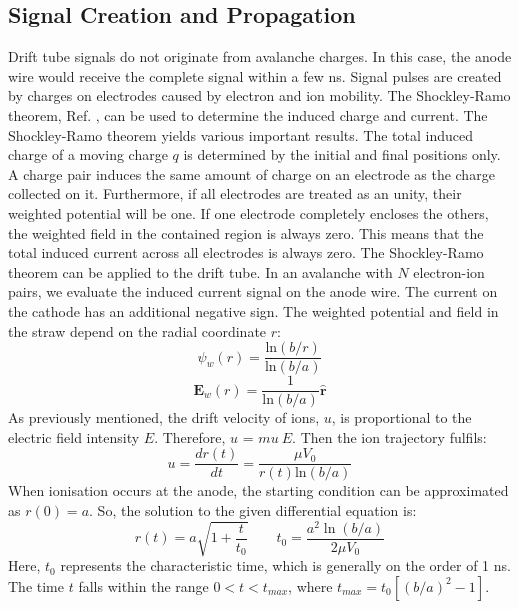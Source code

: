 \subsection{Signal Creation and Propagation}
Drift tube signals do not originate from avalanche charges. In this case, the anode wire would 
receive the complete signal within a few ns. Signal pulses are created by charges on electrodes 
caused by electron and ion mobility. The Shockley-Ramo theorem, Ref. \cite{kola}, can be 
used to determine the induced charge and current. 
The Shockley-Ramo theorem yields various important results. The total induced charge of a moving charge 
$q$ is determined by the initial and final positions only.  A charge pair induces the same amount of 
charge on an electrode as the charge collected on it. Furthermore, if all electrodes are treated as 
an unity, their weighted potential will be one. 
If one electrode completely encloses the others, the weighted field in the contained region is always zero. 
This means that the total induced current across all electrodes is always zero. The Shockley-Ramo theorem can 
be applied to the drift tube. In an avalanche with $N$ electron-ion pairs, we evaluate the induced current 
signal on the anode wire. The current on the cathode has an additional negative sign. The weighted 
potential and field in the straw depend on the radial coordinate $r$:
\begin{equation}
    \psi_w(r)=\frac{\text{ln}(b/r)}{\text{ln}(b/a)}
\end{equation}
\begin{equation}
    \textbf{E}_w(r)=\frac{1}{\text{ln}(b/a)}\hat{\textbf{r}}
\end{equation}
As previously mentioned, the drift velocity of ions, $u$, is proportional to the electric field intensity $E$. Therefore, $u$ = $mu \ E$. 
Then the ion trajectory fulfils:
\begin{equation}
    u=\frac{dr(t)}{dt}=\frac{\mu V_0}{r(t)\text{ln}(b/a)}
\end{equation}
When ionisation occurs at the anode, the starting condition can be approximated as $r(0) = a$. So, the solution to the given differential equation is:
 \begin{equation}
    r(t)=a \sqrt{1+\frac{t}{t_0}} \qquad t_0=\frac{a^2 \ln (b / a)}{2 \mu V_0}
    \end{equation}
Here, $t_0$ represents the characteristic time, which is generally on the order of 1 ns. 
The time $t$ falls within the range $0 < t < t_{max}$, where $t_{max} = t_0 [(b/a)^2 - 1]$. 
